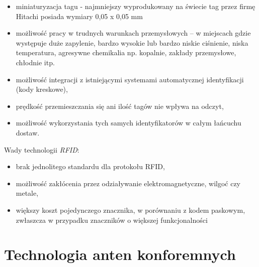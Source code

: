 \begin{itemize}
\begin{itemize}
\begin{itemize}
	\item miniaturyzacja tagu  - najmniejszy wyprodukowany na świecie tag przez firmę Hitachi posiada wymiary 0,05 x 0,05 mm

	\item możliwość pracy w trudnych warunkach przemysłowych –  w miejscach gdzie występuje duże zapylenie, bardzo wysokie lub bardzo niskie ciśnienie, niska temperatura, agresywne chemikalia np. kopalnie, zakłady przemysłowe, chłodnie itp.

	\item możliwość integracji z istniejącymi systemami automatycznej identyfikacji (kody kreskowe),

	\item prędkość przemieszczania się ani ilość tagów nie wpływa na odczyt,

	\item możliwość wykorzystania tych samych identyfikatorów w całym łańcuchu dostaw.

\end{itemize}

Wady technologii \emph{RFID}:


\begin{itemize}\setlength{\itemsep}{0pt}

	\item brak jednolitego standardu dla protokołu RFID,
	
	\item możliwość zakłócenia przez odziaływanie elektromagnetyczne, wilgoć czy metale,
 	
 	\item większy koszt pojedynczego znacznika, w porównaniu z kodem paskowym, zwłaszcza w przypadku znaczników o większej funkcjonalności 

\end{itemize}




\chapter{Technologia anten konforemnych}


\end{itemize}
\end{itemize}

